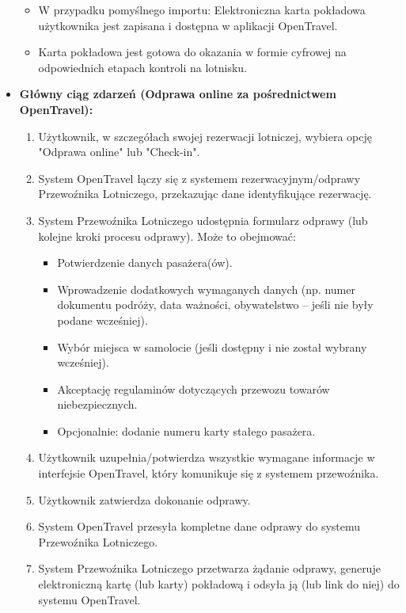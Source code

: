 \documentclass[a4paper,12pt]{article}
\begin{document}
\begin{itemize}
\begin{itemize}
            \item W przypadku pomyślnego importu: Elektroniczna karta pokładowa użytkownika jest zapisana i dostępna w aplikacji OpenTravel.
            \item Karta pokładowa jest gotowa do okazania w formie cyfrowej na odpowiednich etapach kontroli na lotnisku.
        \end{itemize}
    \item \textbf{Główny ciąg zdarzeń (Odprawa online za pośrednictwem OpenTravel):}
        \begin{enumerate}
            \item Użytkownik, w szczegółach swojej rezerwacji lotniczej, wybiera opcję "Odprawa online" lub "Check-in".
            \item System OpenTravel łączy się z systemem rezerwacyjnym/odprawy Przewoźnika Lotniczego, przekazując dane identyfikujące rezerwację.
            \item System Przewoźnika Lotniczego udostępnia formularz odprawy (lub kolejne kroki procesu odprawy). Może to obejmować:
                \begin{itemize}
                    \item Potwierdzenie danych pasażera(ów).
                    \item Wprowadzenie dodatkowych wymaganych danych (np. numer dokumentu podróży, data ważności, obywatelstwo – jeśli nie były podane wcześniej).
                    \item Wybór miejsca w samolocie (jeśli dostępny i nie został wybrany wcześniej).
                    \item Akceptację regulaminów dotyczących przewozu towarów niebezpiecznych.
                    \item Opcjonalnie: dodanie numeru karty stałego pasażera.
                \end{itemize}
            \item Użytkownik uzupełnia/potwierdza wszystkie wymagane informacje w interfejsie OpenTravel, który komunikuje się z systemem przewoźnika.
            \item Użytkownik zatwierdza dokonanie odprawy.
            \item System OpenTravel przesyła kompletne dane odprawy do systemu Przewoźnika Lotniczego.
            \item System Przewoźnika Lotniczego przetwarza żądanie odprawy, generuje elektroniczną kartę (lub karty) pokładową i odsyła ją (lub link do niej) do systemu OpenTravel.

\end{enumerate}
\end{itemize}
\end{document}
